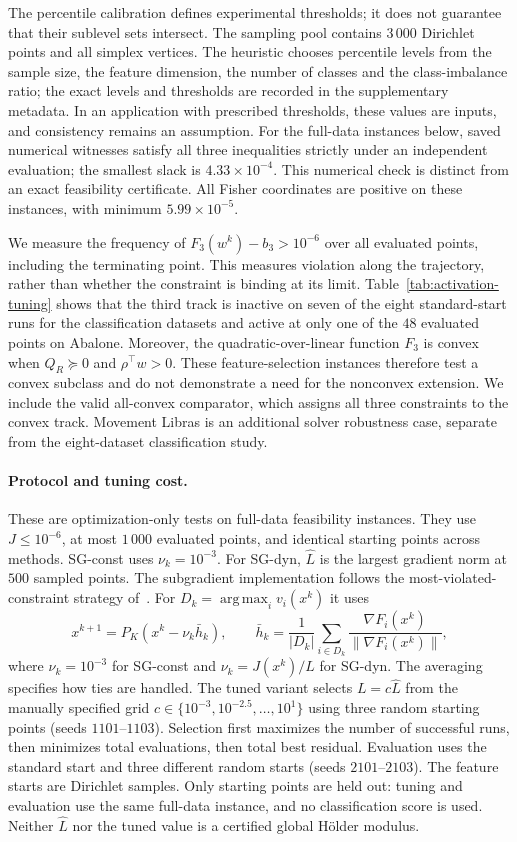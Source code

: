 \documentclass[]{interact}
\theoremstyle{plain}
\theoremstyle{definition}
\theoremstyle{remark}
\DeclareMathOperator*{\argmax}{arg\,max}
\begin{document}
The percentile calibration defines experimental thresholds; it does not
guarantee that their sublevel sets intersect. The sampling pool contains
$3\,000$ Dirichlet points and all simplex vertices. The heuristic chooses
percentile levels from the sample size, the feature dimension, the number of
classes and the class-imbalance ratio; the exact
levels and thresholds are recorded in the supplementary metadata. In an
application with prescribed thresholds, these values are inputs, and consistency remains an
assumption. For the full-data instances below, saved numerical witnesses
satisfy all three inequalities strictly under an independent evaluation;
the smallest slack is $4.33\times10^{-4}$. This numerical check is distinct
from an exact feasibility certificate. All Fisher coordinates are positive
on these instances, with minimum $5.99\times10^{-5}$.

We measure the frequency of $F_3(w^k)-b_3>10^{-6}$ over all evaluated
points, including the terminating point. This measures violation along the
trajectory, rather than whether the constraint is binding at its limit.
Table~\ref{tab:activation-tuning} shows that the third track is inactive
on seven of the eight standard-start runs for the classification datasets and active at only one
of the $48$ evaluated points on Abalone. Moreover, the quadratic-over-linear
function $F_3$ is convex when $Q_R\succeq0$ and $\rho^\top w>0$.
These feature-selection instances therefore test a convex subclass and do
not demonstrate a need for the nonconvex extension. We include the valid
all-convex comparator, which assigns all three constraints to the convex
track. Movement Libras is an additional solver robustness case, separate
from the eight-dataset classification study.

\paragraph*{Protocol and tuning cost.}
These are optimization-only tests on full-data feasibility instances.
They use $J\le10^{-6}$, at most $1\,000$ evaluated points, and identical
starting points across methods. SG-const uses $\nu_k=10^{-3}$. For SG-dyn,
$\widehat L$ is the largest gradient norm at $500$ sampled points.
The subgradient implementation follows the most-violated-constraint
strategy of~\citep{hu2022quasi}. For $D_k=\argmax_i v_i(x^k)$ it uses
\[
x^{k+1}=P_K(x^k-\nu_k\bar h_k),\qquad
\bar h_k=\frac1{|D_k|}\sum_{i\in D_k}
\frac{\nabla F_i(x^k)}{\|\nabla F_i(x^k)\|},
\]
where $\nu_k=10^{-3}$ for SG-const and $\nu_k=J(x^k)/L$ for SG-dyn.
The averaging specifies how ties are handled.
The tuned variant selects $L=c\widehat L$ from the manually specified grid
$c\in\{10^{-3},10^{-2.5},\ldots,10^1\}$ using three random starting
points (seeds $1101$--$1103$). Selection first maximizes the number of
successful runs, then minimizes total evaluations, then total best residual.
Evaluation uses the standard start and three different random starts
(seeds $2101$--$2103$). The feature starts are Dirichlet samples.
Only starting points are held out: tuning and evaluation use the same
full-data instance, and no classification score is used. Neither
$\widehat L$ nor the tuned value is a certified global H\"older modulus.
\end{document}
